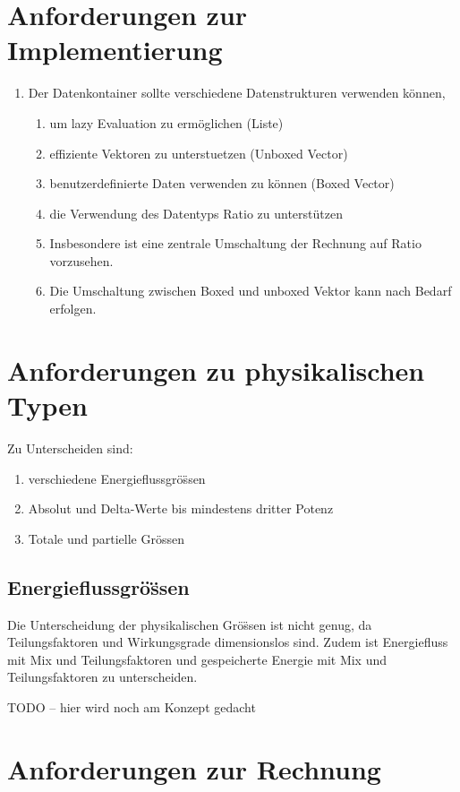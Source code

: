 \documentclass[11pt]{article}
\begin{document}
\section{Anforderungen zur Implementierung}

\begin{enumerate}
\item Der Datenkontainer sollte verschiedene Datenstrukturen verwenden k\"onnen, 
\begin{enumerate}
\item um lazy Evaluation zu erm\"oglichen (Liste)
\item effiziente Vektoren zu unterstuetzen (Unboxed Vector)
\item benutzerdefinierte Daten verwenden zu k\"onnen (Boxed Vector)
\item die Verwendung des Datentyps Ratio zu unterst\"utzen
\item Insbesondere ist eine zentrale Umschaltung der Rechnung auf Ratio vorzusehen.
\item Die Umschaltung zwischen Boxed und unboxed Vektor kann nach Bedarf erfolgen.
\end{enumerate}
\end{enumerate}

\section{Anforderungen zu physikalischen Typen}

Zu Unterscheiden sind:

\begin{enumerate}
\item verschiedene Energieflussgr\"o\"ssen
\item Absolut und Delta-Werte bis mindestens dritter Potenz
\item Totale und partielle Gr\"ossen
\end{enumerate}

\subsection{Energieflussgr\"o\"ssen}
Die Unterscheidung der physikalischen Gr\"o\"ssen ist nicht genug, 
da Teilungsfaktoren und Wirkungsgrade dimensionslos sind. Zudem ist 
Energiefluss mit Mix und Teilungsfaktoren und gespeicherte Energie mit 
Mix und Teilungsfaktoren zu unterscheiden. 

TODO -- hier wird noch am Konzept gedacht  

\section{Anforderungen zur Rechnung}
\end{document}
